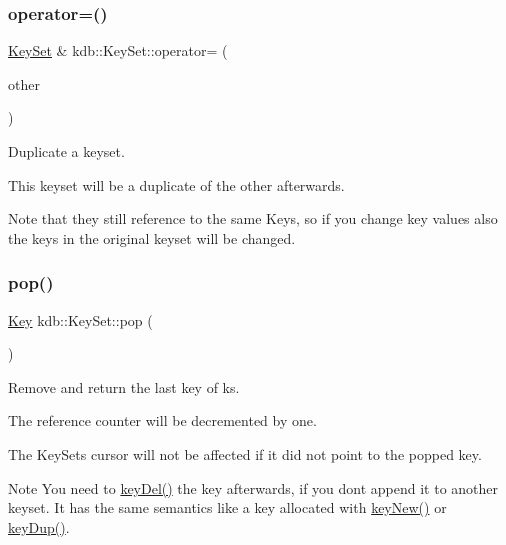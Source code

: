 \subsubsection{\texorpdfstring{operator=()}{operator=()}}
{\footnotesize\ttfamily \mbox{\hyperlink{classkdb_1_1KeySet}{Key\+Set}} \& kdb\+::\+Key\+Set\+::operator= (\begin{DoxyParamCaption}\item[{\mbox{\hyperlink{classkdb_1_1KeySet}{Key\+Set}} const \&}]{other }\end{DoxyParamCaption})\hspace{0.3cm}{\ttfamily [inline]}}



Duplicate a keyset. 

This keyset will be a duplicate of the other afterwards.

\begin{DoxyNote}{Note}
that they still reference to the same Keys, so if you change key values also the keys in the original keyset will be changed. 
\end{DoxyNote}
\mbox{\label{classkdb_1_1KeySet_a7f207457a1c12633a1a5301a3a1bbaed}} 
\subsubsection{\texorpdfstring{pop()}{pop()}}
{\footnotesize\ttfamily \mbox{\hyperlink{classkdb_1_1Key}{Key}} kdb\+::\+Key\+Set\+::pop (\begin{DoxyParamCaption}{ }\end{DoxyParamCaption})\hspace{0.3cm}{\ttfamily [inline]}}



Remove and return the last key of {\ttfamily ks}. 

The reference counter will be decremented by one.

The Key\+Sets cursor will not be affected if it did not point to the popped key.

\begin{DoxyNote}{Note}
You need to \mbox{\hyperlink{group__key_ga3df95bbc2494e3e6703ece5639be5bb1}{key\+Del()}} the key afterwards, if you don\textquotesingle{}t append it to another keyset. It has the same semantics like a key allocated with \mbox{\hyperlink{group__key_gad23c65b44bf48d773759e1f9a4d43b89}{key\+New()}} or \mbox{\hyperlink{group__key_gae6ec6a60cc4b8c1463fa08623d056ce3}{key\+Dup()}}.
\end{DoxyNote}

